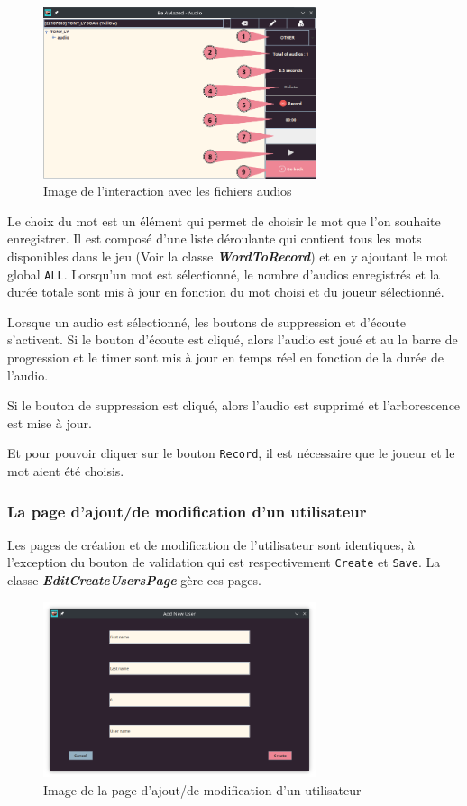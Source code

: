\begin{figure}[htb]
    \centering
    \includegraphics[width=8cm]{ressources/Implementation/Son/GestionFichiersAudio.png}%
    \caption{Image de l'interaction avec les fichiers audios}%
\end{figure}

Le choix du mot est un élément qui permet de choisir le mot que l'on souhaite
enregistrer. Il est composé d'une liste déroulante qui contient tous les mots
disponibles dans le jeu (Voir la classe \textbf{\textit{WordToRecord}}) et en
y ajoutant le mot global \texttt{ALL}.
Lorsqu'un mot est sélectionné, le nombre d'audios enregistrés et la durée
totale sont mis à jour en fonction du mot choisi et du joueur sélectionné.

Lorsque un audio est sélectionné, les boutons de suppression et d'écoute
s'activent. Si le bouton d'écoute est cliqué, alors l'audio est joué et au
la barre de progression et le timer sont mis à jour en temps réel en fonction
de la durée de l'audio.

Si le bouton de suppression est cliqué, alors l'audio est supprimé et l'arborescence
est mise à jour.

Et pour pouvoir cliquer sur le bouton \texttt{Record}, il est nécessaire que le
joueur et le mot aient été choisis.


\subsubsection*{La page d'ajout/de modification d'un utilisateur}
\label{subsubsec:sonVueAjoutModifUtilisateur}

Les pages de création et de modification de l'utilisateur sont identiques, à
l'exception du bouton de validation qui est respectivement \texttt{Create}
et \texttt{Save}. La classe \textbf{\textit{EditCreateUsersPage}} gère ces
pages.

\begin{figure}[!htb]
    \centering
    \includegraphics[width=8cm]{ressources/Implementation/Son/AddEditUser.png}%
    \caption{Image de la page d'ajout/de modification d'un utilisateur}
    \label{fig:CreateOrSaveUserPage}
\end{figure}

